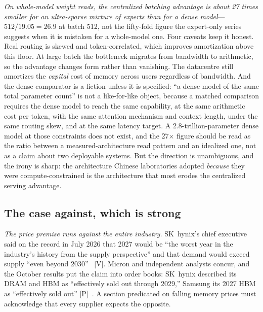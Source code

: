\emph{On whole-model weight reads, the centralized batching advantage is about 27 times smaller for an ultra-sparse mixture of experts than for a dense model}---$512/19.05 = 26.9$ at batch 512, not the fifty-fold figure the expert-only series suggests when it is mistaken for a whole-model one. Four caveats keep it honest. Real routing is skewed and token-correlated, which improves amortization above this floor. At large batch the bottleneck migrates from bandwidth to arithmetic, so the advantage changes form rather than vanishing. The datacentre still amortizes the \emph{capital} cost of memory across users regardless of bandwidth. And the dense comparator is a fiction unless it is specified: ``a dense model of the same total parameter count'' is not a like-for-like object, because a matched comparison requires the dense model to reach the same capability, at the same arithmetic cost per token, with the same attention mechanism and context length, under the same routing skew, and at the same latency target. A 2.8-trillion-parameter dense model at those constraints does not exist, and the 27$\times$ figure should be read as the ratio between a measured-architecture read pattern and an idealized one, not as a claim about two deployable systems. But the direction is unambiguous, and the irony is sharp: the architecture Chinese laboratories adopted \emph{because} they were compute-constrained is the architecture that most erodes the centralized serving advantage.

\subsection{The case against, which is strong}
\label{sec:caseagainst}

\emph{The price premise runs against the entire industry.} SK~hynix's chief executive said on the record in July 2026 that 2027 would be ``the worst year in the industry's history from the supply perspective'' and that demand would exceed supply ``even beyond 2030''~\cite{skhynix-shortage} [V]. Micron and independent analysts concur, and the October results put the claim into order books: SK~hynix described its DRAM and HBM as ``effectively sold out through 2029,'' Samsung its 2027 HBM as ``effectively sold out'' [P]~\cite{hw-skhynix-q3,hw-samsung-q3}. A section predicated on falling memory prices must acknowledge that every supplier expects the opposite.

